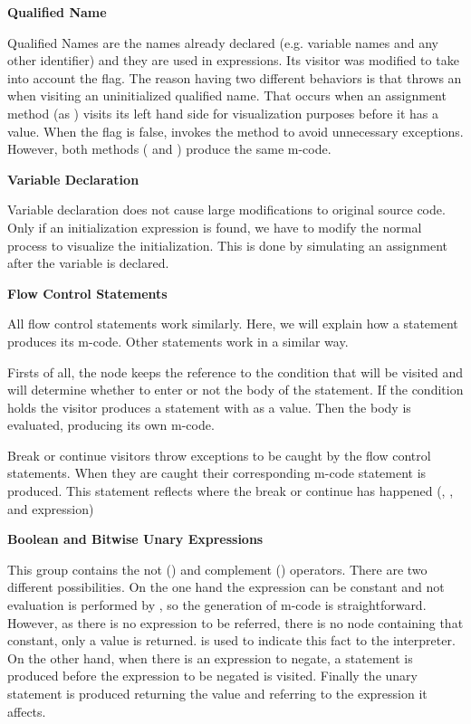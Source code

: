 {\bf{Qualified Name}}

Qualified Names are the names already declared (e.g. variable
names and any other identifier) and they are used in expressions.
Its visitor was modified to take into account the 
flag. The reason having two different behaviors is that \djava{}
throws an  when visiting an uninitialized
qualified name. That occurs when an assignment method (as
) visits its left hand side for
visualization purposes before it has a value. When the
 flag is false, \djava{} invokes the 
method to avoid unnecessary exceptions. However, both methods
( and ) produce the same m-code.

{\bf{Variable Declaration}}

Variable declaration does not cause large modifications to
original source code. Only if an initialization expression is
found, we have to modify the normal process to visualize the
initialization. This is done by simulating an assignment after the
variable is declared.

{\bf{Flow Control Statements}}

All flow control statements work similarly. Here, we will explain
how a  statement produces its m-code. Other statements
work in a similar way.

Firsts of all, the  node keeps the reference to
the condition that will be visited and will determine whether to
enter or not the body of the statement. If the condition holds the
visitor produces a  statement with  as a value.
Then the body is evaluated, producing its own m-code.

Break or continue visitors throw exceptions to be caught by the flow
control statements. When they are caught their corresponding m-code
statement is produced. This statement reflects where the break or
continue has happened (, ,  and  expression)

{\bf{Boolean and Bitwise Unary Expressions}}

This group contains the not (\p{!}) and complement (\p{\~})
operators. There are two different possibilities. On the one hand
the expression can be constant and not evaluation is performed by
\djava{}, so the generation of m-code is straightforward. However,
as there is no expression to be referred, there is no node
containing that constant, only a value is returned.
 is used to indicate this fact to the
interpreter. On the other hand, when there is an expression to
negate, a  statement is produced before the expression to
be negated is visited. Finally the unary statement is produced
returning the value and referring to the expression it affects.

